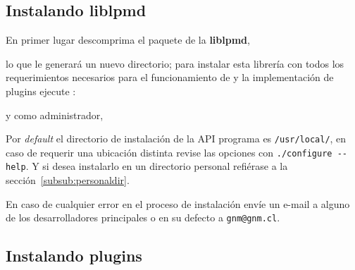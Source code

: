 
\subsection{Instalando liblpmd}

% 
% 

En primer lugar descomprima el paquete de la \textbf{liblpmd},


lo que le generar\'a un nuevo directorio; para instalar esta librer\'ia con todos los requerimientos necesarios para el funcionamiento de {\lpmd} y la implementaci\'on de plugins ejecute :


y como administrador,




Por \textit{default} el directorio de instalaci\'on de la API programa es \verb|/usr/local/|, en caso de requerir una ubicaci\'on distinta revise las opciones con \verb|./configure --help|. Y si desea instalarlo en un directorio personal refi\'erase a la secci\'on~\ref{subsub:personaldir}.

En caso de cualquier error en el proceso de instalaci\'on env\'ie un e-mail a alguno de los desarrolladores principales o en su defecto a \verb|gnm@gnm.cl|.

\subsection{Instalando plugins}

